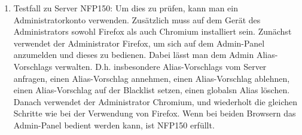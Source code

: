 \begin{enumerate}[label=\textbf{/T\arabic*0/}, align=left]
	\item Testfall zu Server NFP150: Um dies zu prüfen, kann man ein \Gls{Administrator}konto verwenden. Zusätzlich muss auf dem Gerät des \Gls{Administrator}s sowohl \Gls{Firefox} als auch \Gls{Chromium} installiert sein. Zunächst verwendet der \Gls{Administrator} \Gls{Firefox}, um sich auf dem \Gls{Admin-Panel} anzumelden und dieses zu bedienen. Dabei lässt man dem \Gls{Admin} \Glspl{Alias-Vorschlag} verwalten. D.h. insbesondere \Glspl{Alias-Vorschlag} vom \Gls{Server} anfragen, einen \Gls{Alias-Vorschlag} annehmen, einen \Gls{Alias-Vorschlag} ablehnen, einen \Gls{Alias-Vorschlag} auf der \Gls{Blacklist} setzen, einen \glspl{global}n \Gls{Alias} löschen. Danach verwendet der \Gls{Administrator} \Gls{Chromium}, und wiederholt die gleichen Schritte wie bei der Verwendung von \Gls{Firefox}. Wenn bei beiden \Gls{Browser}n das \Gls{Admin-Panel} bedient werden kann, ist NFP150 erfüllt.
\end{enumerate}